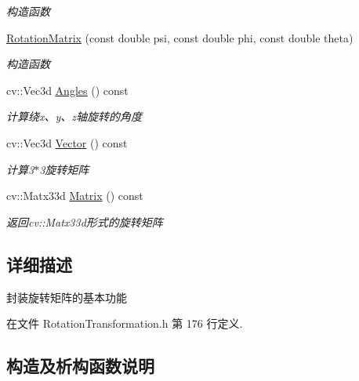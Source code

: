 \begin{DoxyCompactItemize}
\begin{DoxyCompactList}\small\item\em 构造函数 \end{DoxyCompactList}\item 
\mbox{\hyperlink{classmy__linear__algebra_1_1_rotation_matrix_ac0f10d4f04cad4290b386187773db668}{Rotation\+Matrix}} (const double psi, const double phi, const double theta)
\begin{DoxyCompactList}\small\item\em 构造函数 \end{DoxyCompactList}\item 
cv\+::\+Vec3d \mbox{\hyperlink{classmy__linear__algebra_1_1_rotation_matrix_a6497a83df6764478fcf0d75fd6482979}{Angles}} () const
\begin{DoxyCompactList}\small\item\em 计算绕x、y、z轴旋转的角度 \end{DoxyCompactList}\item 
cv\+::\+Vec3d \mbox{\hyperlink{classmy__linear__algebra_1_1_rotation_matrix_aff450dadd4a37acb67171ba76832300f}{Vector}} () const
\begin{DoxyCompactList}\small\item\em 计算3$\ast$3旋转矩阵 \end{DoxyCompactList}\item 
cv\+::\+Matx33d \mbox{\hyperlink{classmy__linear__algebra_1_1_rotation_matrix_a546939fe80b057e325042b35bd0b0a57}{Matrix}} () const
\begin{DoxyCompactList}\small\item\em 返回cv\+::\+Matx33d形式的旋转矩阵 \end{DoxyCompactList}\end{DoxyCompactItemize}


\subsection{详细描述}
封装旋转矩阵的基本功能 

在文件 Rotation\+Transformation.\+h 第 176 行定义.



\subsection{构造及析构函数说明}
\mbox{\label{classmy__linear__algebra_1_1_rotation_matrix_ace11939dfa128364be007d86d584f448}} 
